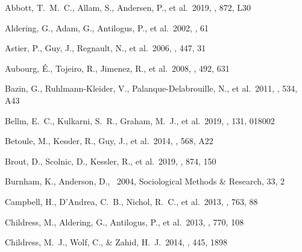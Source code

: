 \documentclass[]{aa} %
\begin{document}
\begin{thebibliography}{} 


 Abbott, T.~M.~C., Allam, S.,
Andersen, P., et al.\ 2019, \apjl, 872, L30

 Aldering, G., Adam, G., Antilogus,
P., et al.\ 2002, \procspie, 61

 Astier, P., Guy, J., Regnault, N., et
al.\ 2006, \aap, 447, 31


 Aubourg, {\'E}., Tojeiro, R.,
Jimenez, R., et al.\ 2008, \aap, 492, 631 


 Bazin, G., Ruhlmann-Kleider, V.,
Palanque-Delabrouille, N., et al.\ 2011, \aap, 534, A43

 Bellm, E.~C., Kulkarni, S.~R., Graham,
M.~J., et al.\ 2019, \pasp, 131, 018002

 Betoule, M., Kessler, R., Guy, J.,
et al.\ 2014, \aap, 568, A22

 Brout, D., Scolnic, D., Kessler, R., et
al.\ 2019, \apj, 874, 150

 Burnham, K., Anderson, D., \
2004, Sociological Methods \& Research, 33, 2


 Campbell, H., D'Andrea, C.~B.,
Nichol, R.~C., et al.\ 2013, \apj, 763, 88


 Childress, M., Aldering, G.,
Antilogus, P., et al.\ 2013, \apj, 770, 108

 Childress, M.~J., Wolf, C., \&
Zahid, H.~J.\ 2014, \mnras, 445, 1898


\end{thebibliography}
\end{document}
